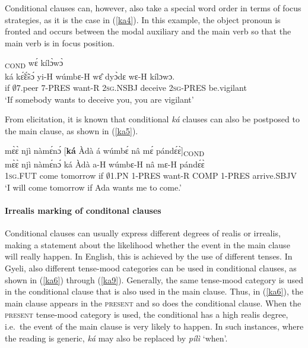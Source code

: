 Conditional clauses can, however, also take a special word order in terms of focus strategies, as it is the case in (\ref{ka4}). In this example, the object pronoun is fronted and occurs between the modal auxiliary and the main verb so that the main verb is in focus position.

\begin{exe} 
\ex\label{ka4}
  \textsubscript{COND} wɛ́ kílɔ̀wɔ̀ \\
        ká kɛ̃́ɛ̃́sɔ́ yi-H wúmbɛ-H wɛ̂ dyɔ̀dɛ wɛ-H kílɔwɔ. \\
         if $\emptyset$7.peer 7-PRES want-R 2\textsc{sg}.NSBJ deceive 2\textsc{sg}-PRES be.vigilant  \\
    \trans `If somebody wants to deceive you, you are vigilant'
\end{exe}

\noindent From elicitation, it is known that conditional {\itshape ká} clauses can also be postposed to the main clause, as shown in (\ref{ka5}).

\begin{exe}
\ex\label{ka5}
  \glll mɛ̀ɛ̀ njì nàmɛ́nɔ́ [{\bfseries ká} Àdà á wúmbɛ́ nâ mɛ́ pándɛ́ɛ̀]\textsubscript{COND} \\
       mɛ̀ɛ̀ njì nàmɛ́nɔ́ ká Àdà a-H wúmbɛ-H nâ mɛ-H pándɛ́ɛ̀ \\
       1\textsc{sg}.FUT come tomorrow if $\emptyset$1.PN 1-PRES want-R COMP 1-PRES arrive.SBJV \\
    \trans `I will come tomorrow if Ada wants me to come.'
\end{exe}


\paragraph{Irrealis marking of conditonal clauses}
Conditional clauses can usually express different degrees of realis or irrealis, making a statement about the likelihood whether the event in the main clause will really happen. In English, this is achieved by the use of different tenses. In Gyeli, also different tense-mood categories can be used in conditional clauses, as shown in (\ref{ka6}) through (\ref{ka9}). Generally, the same tense-mood category is used in the conditional clause that is also used in the main clause. Thus, in (\ref{ka6}), the main clause appears in the \textsc{present} and so does the conditional clause. When the \textsc{present} tense-mood category is used, the conditional has a high realis degree, i.e.\ the event of the main clause is very likely to happen. In such instances, where the reading is generic, {\itshape ká} may also be replaced by {\itshape pílì} `when'.


